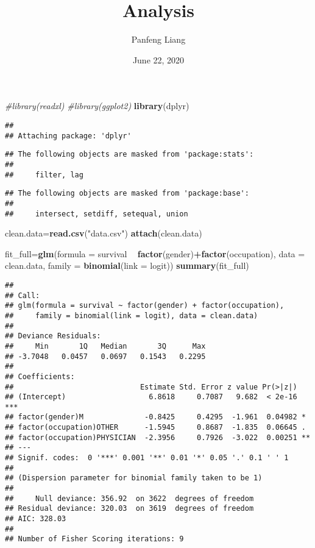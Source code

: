 \documentclass[]{article}
\title{Analysis}
\author{Panfeng Liang}
\date{June 22, 2020}
\newenvironment{Shaded}{\begin{snugshade}}{\end{snugshade}}
\newcommand{\KeywordTok}[1]{\textcolor[rgb]{0.13,0.29,0.53}{\textbf{#1}}}
\newcommand{\DataTypeTok}[1]{\textcolor[rgb]{0.13,0.29,0.53}{#1}}
\newcommand{\StringTok}[1]{\textcolor[rgb]{0.31,0.60,0.02}{#1}}
\newcommand{\CommentTok}[1]{\textcolor[rgb]{0.56,0.35,0.01}{\textit{#1}}}
\newcommand{\OperatorTok}[1]{\textcolor[rgb]{0.81,0.36,0.00}{\textbf{#1}}}
\newcommand{\NormalTok}[1]{#1}
\begin{document}
\maketitle

\begin{Shaded}
\begin{Highlighting}[]
\CommentTok{#library(readxl)}
\CommentTok{#library(ggplot2)}
\KeywordTok{library}\NormalTok{(dplyr)}
\end{Highlighting}
\end{Shaded}

\begin{verbatim}
## 
## Attaching package: 'dplyr'
\end{verbatim}

\begin{verbatim}
## The following objects are masked from 'package:stats':
## 
##     filter, lag
\end{verbatim}

\begin{verbatim}
## The following objects are masked from 'package:base':
## 
##     intersect, setdiff, setequal, union
\end{verbatim}

\begin{Shaded}
\begin{Highlighting}[]
\NormalTok{clean.data=}\KeywordTok{read.csv}\NormalTok{(}\StringTok{"data.csv"}\NormalTok{)}
\KeywordTok{attach}\NormalTok{(clean.data)}

\NormalTok{fit_full=}\KeywordTok{glm}\NormalTok{(}\DataTypeTok{formula =}\NormalTok{ survival }\OperatorTok{~}\StringTok{ }\KeywordTok{factor}\NormalTok{(gender)}\OperatorTok{+}\KeywordTok{factor}\NormalTok{(occupation), }\DataTypeTok{data =}\NormalTok{ clean.data, }\DataTypeTok{family =} \KeywordTok{binomial}\NormalTok{(}\DataTypeTok{link =}\NormalTok{ logit))}
\KeywordTok{summary}\NormalTok{(fit_full)}
\end{Highlighting}
\end{Shaded}

\begin{verbatim}
## 
## Call:
## glm(formula = survival ~ factor(gender) + factor(occupation), 
##     family = binomial(link = logit), data = clean.data)
## 
## Deviance Residuals: 
##     Min       1Q   Median       3Q      Max  
## -3.7048   0.0457   0.0697   0.1543   0.2295  
## 
## Coefficients:
##                             Estimate Std. Error z value Pr(>|z|)    
## (Intercept)                   6.8618     0.7087   9.682  < 2e-16 ***
## factor(gender)M              -0.8425     0.4295  -1.961  0.04982 *  
## factor(occupation)OTHER      -1.5945     0.8687  -1.835  0.06645 .  
## factor(occupation)PHYSICIAN  -2.3956     0.7926  -3.022  0.00251 ** 
## ---
## Signif. codes:  0 '***' 0.001 '**' 0.01 '*' 0.05 '.' 0.1 ' ' 1
## 
## (Dispersion parameter for binomial family taken to be 1)
## 
##     Null deviance: 356.92  on 3622  degrees of freedom
## Residual deviance: 320.03  on 3619  degrees of freedom
## AIC: 328.03
## 
## Number of Fisher Scoring iterations: 9
\end{verbatim}
\end{document}
